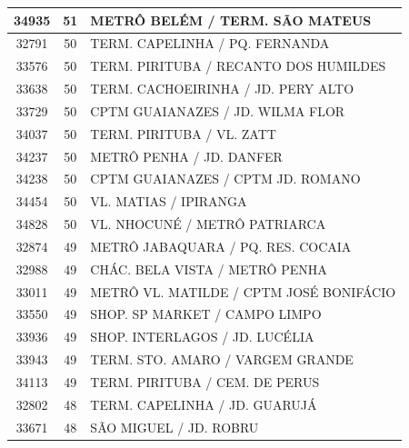 \documentclass[
	12pt,				%
	oneside,			%
	a4paper,			%
	english,			%
	brazil				%
	]{abntex2ppgsi}
\begin{document}
\begin{apendicesenv}
\begin{longtable}{c|c|p{7cm}}
    34935 & 51    & METRÔ BELÉM / TERM. SÃO MATEUS \\
\hline

    32791 & 50    & TERM. CAPELINHA / PQ. FERNANDA \\
\hline

    33576 & 50    & TERM. PIRITUBA / RECANTO DOS HUMILDES \\
\hline

    33638 & 50    & TERM. CACHOEIRINHA / JD. PERY ALTO \\
\hline

    33729 & 50    & CPTM GUAIANAZES / JD. WILMA FLOR \\
\hline

    34037 & 50    & TERM. PIRITUBA / VL. ZATT \\
\hline

    34237 & 50    & METRÔ PENHA / JD. DANFER \\
\hline

    34238 & 50    & CPTM GUAIANAZES / CPTM JD. ROMANO \\
\hline

    34454 & 50    & VL. MATIAS / IPIRANGA \\
\hline

    34828 & 50    & VL. NHOCUNÉ / METRÔ PATRIARCA \\
\hline

    32874 & 49    & METRÔ JABAQUARA / PQ. RES. COCAIA \\
\hline

    32988 & 49    & CHÁC. BELA VISTA / METRÔ PENHA \\
\hline

    33011 & 49    & METRÔ VL. MATILDE / CPTM JOSÉ BONIFÁCIO \\
\hline

    33550 & 49    & SHOP. SP MARKET / CAMPO LIMPO \\
\hline

    33936 & 49    & SHOP. INTERLAGOS / JD. LUCÉLIA \\
\hline

    33943 & 49    & TERM. STO. AMARO / VARGEM GRANDE \\
\hline

    34113 & 49    & TERM. PIRITUBA / CEM. DE PERUS \\
\hline

    32802 & 48    & TERM. CAPELINHA / JD. GUARUJÁ \\
\hline

    33671 & 48    & SÃO MIGUEL / JD. ROBRU \\
\hline


\end{longtable}
\end{apendicesenv}
\end{document}
